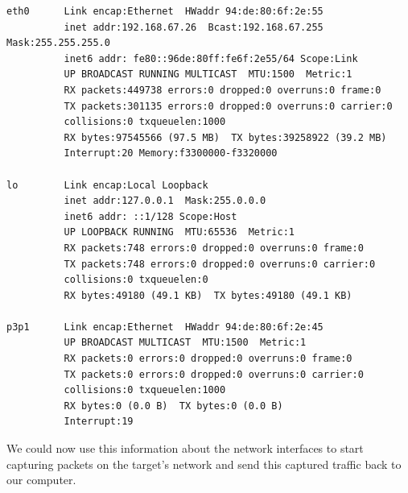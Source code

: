 \documentclass{article}
\begin{document}
\begin{verbatim}
eth0      Link encap:Ethernet  HWaddr 94:de:80:6f:2e:55  
          inet addr:192.168.67.26  Bcast:192.168.67.255  Mask:255.255.255.0
          inet6 addr: fe80::96de:80ff:fe6f:2e55/64 Scope:Link
          UP BROADCAST RUNNING MULTICAST  MTU:1500  Metric:1
          RX packets:449738 errors:0 dropped:0 overruns:0 frame:0
          TX packets:301135 errors:0 dropped:0 overruns:0 carrier:0
          collisions:0 txqueuelen:1000 
          RX bytes:97545566 (97.5 MB)  TX bytes:39258922 (39.2 MB)
          Interrupt:20 Memory:f3300000-f3320000 

lo        Link encap:Local Loopback  
          inet addr:127.0.0.1  Mask:255.0.0.0
          inet6 addr: ::1/128 Scope:Host
          UP LOOPBACK RUNNING  MTU:65536  Metric:1
          RX packets:748 errors:0 dropped:0 overruns:0 frame:0
          TX packets:748 errors:0 dropped:0 overruns:0 carrier:0
          collisions:0 txqueuelen:0 
          RX bytes:49180 (49.1 KB)  TX bytes:49180 (49.1 KB)

p3p1      Link encap:Ethernet  HWaddr 94:de:80:6f:2e:45  
          UP BROADCAST MULTICAST  MTU:1500  Metric:1
          RX packets:0 errors:0 dropped:0 overruns:0 frame:0
          TX packets:0 errors:0 dropped:0 overruns:0 carrier:0
          collisions:0 txqueuelen:1000 
          RX bytes:0 (0.0 B)  TX bytes:0 (0.0 B)
          Interrupt:19 
\end{verbatim}

We could now use this information about the network interfaces to start capturing packets on the target's network and send this captured traffic back to our computer.
\end{document}
